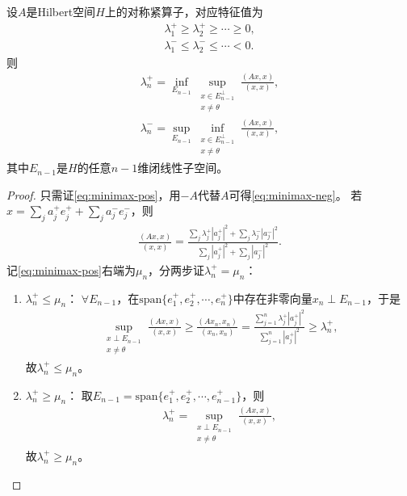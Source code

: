 \documentclass[../../main.tex]{subfiles}%
\begin{document}
\begin{theorem}[极小极大刻画]
设$A$是Hilbert空间$H$上的对称紧算子，对应特征值为
\begin{align*}
\lambda_1^+\geqslant\lambda_2^+\geqslant\cdots\geqslant0,\\
\lambda_1^-\leqslant\lambda_2^-\leqslant\cdots<0.
\end{align*}
则
\begin{align}
\lambda_n^+=\inf_{E_{n-1}}\sup_{\substack{x\in E_{n-1}^\perp\\x\neq\theta}}\frac{(Ax,x)}{(x,x)},\label{eq:minimax-pos}\\
\lambda_n^-=\sup_{E_{n-1}}\inf_{\substack{x\in E_{n-1}^\perp\\x\neq\theta}}\frac{(Ax,x)}{(x,x)},\label{eq:minimax-neg}
\end{align}
其中$E_{n-1}$是$H$的任意$n-1$维闭线性子空间。
\end{theorem}
\begin{proof}

只需证\eqref{eq:minimax-pos}，用$-A$代替$A$可得\eqref{eq:minimax-neg}。
若$\displaystyle x=\sum\limits_{j}a_j^+e_j^++\sum\limits_{j}a_j^-e_j^-$，则
\begin{align*}
\frac{(Ax,x)}{(x,x)}=\frac{\sum\limits_{j}\lambda_j^+|a_j^+|^2+\sum\limits_{j}\lambda_j^-|a_j^-|^2}{\sum\limits_{j}|a_j^+|^2+\sum\limits_{j}|a_j^-|^2}.
\end{align*}
记\eqref{eq:minimax-pos}右端为$\mu_n$，分两步证$\lambda_n^+=\mu_n$：
\begin{enumerate}[(1)]
\item $\lambda_n^+\leqslant\mu_n$：
$\forall E_{n-1}$，在$\mathrm{span}\{e_1^+,e_2^+,\cdots,e_n^+\}$中存在非零向量$x_n\perp E_{n-1}$，于是
\begin{align*}
\sup_{\substack{x\perp E_{n-1}\\x\neq\theta}}\frac{(Ax,x)}{(x,x)}\geqslant\frac{(Ax_n,x_n)}{(x_n,x_n)}=\frac{\sum\limits_{j=1}^{n}\lambda_j^+|a_j^+|^2}{\sum\limits_{j=1}^{n}|a_j^+|^2}\geqslant\lambda_n^+,
\end{align*}
故$\lambda_n^+\leqslant\mu_n$。
\item $\lambda_n^+\geqslant\mu_n$：
取$E_{n-1}=\mathrm{span}\{e_1^+,e_2^+,\cdots,e_{n-1}^+\}$，则
\begin{align*}
\lambda_n^+=\sup_{\substack{x\perp E_{n-1}\\x\neq\theta}}\frac{(Ax,x)}{(x,x)},
\end{align*}
故$\lambda_n^+\geqslant\mu_n$。
\end{enumerate}

\end{proof}
\end{document}
